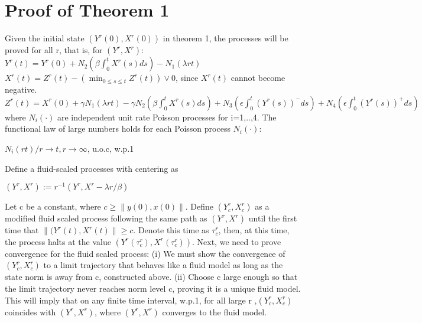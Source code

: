 \section*{Proof of Theorem 1}

Given the initial state $(Y^r(0), X^r (0))$ in theorem 1, the processes will be proved for all r, that is, for $(Y^r , X^r)$:
\newline
\newline$Y^r(t)=Y^r(0) +N_2 (\beta \int_0^tX^r(s)ds)-N_1(\lambda rt) $
\newline
\newline $X^r(t)= Z^r(t) - (\min_{0\leq s\leq t} Z^r(t)) \vee 0$, since $X^r(t)$ cannot become negative.
\newline
\newline $Z^r(t)=X^r(0) + \gamma N_1(\lambda rt) - \gamma N_2(\beta \int_0^tX^r(s)ds) +N_3(\epsilon \int_0^t(Y^r(s))^-ds) + N_4(\epsilon \int_0^t(Y^r(s))^+ds)$
\newline
\newline where $N_i(\cdot)$ are independent unit rate Poisson processes for i=1,..,4.
\newline
\newline The functional law of large numbers holds for each Poisson process $N_i(\cdot)$:
\newline
\begin{center}$ N_i(rt)/r \rightarrow t,r \rightarrow \infty$, u.o.c, w.p.1
\end{center}
\newpage 
Define a fluid-scaled processes with centering as
\begin{center}
$(Y^r , X^r):= r^{-1} (Y^r, X^r - \lambda r/\beta)$
\end{center}
\newline
\newline
Let c be a constant, where $ c \geq \| y(0), x(0) \|$. Define $(Y_c^r,X_c^r)$ as a modified fluid scaled process following the same path as $(Y^r,X^r)$ until the first time that $\|(Y^r(t),X^r(t)\| \geq c$. Denote this time as $\tau_c^r$, then, at this time, the process halts at the value $(Y^r(\tau_c^r),X^r(\tau_c^r))$. 
\newline
\newline Next, we need to prove convergence for the fluid scaled process:
\newline (i) We must show the convergence of $(Y_c^r,X_c^r)$ to a limit trajectory that behaves like a fluid model as long as the state norm is away from c, constructed above.
\newline (ii) Choose c large enough so that the limit trajectory never reaches norm level c, proving it is a unique fluid model. This will imply that on any finite time interval, w.p.1, for all large r ,$(Y_c^r, X_c^r)$ coincides with $(Y^ r , X^ r )$, where $(Y^ r , X^ r )$ converges to the fluid model.
